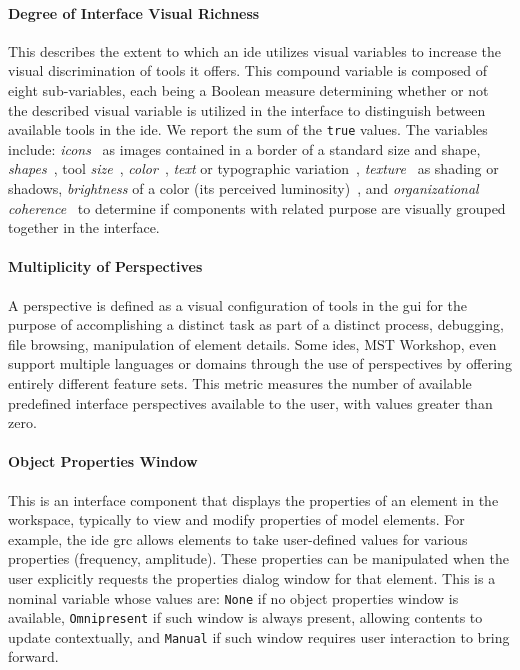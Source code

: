 \paragraph{Degree of Interface Visual Richness}
This describes the extent to which an \ac{ide} utilizes visual variables to increase the visual discrimination of tools it offers.
This compound variable is composed of eight sub-variables, each being a Boolean measure determining whether or not the described visual variable is utilized in the interface to distinguish between available tools in the \ac{ide}.
We report the sum of the \texttt{true} values.
The variables include:
\emph{icons}~\cite{costagliola2002,moody2009} as images contained in a border of a standard size and shape,
\emph{shapes}~\cite{moody2009},
tool \emph{size}~\cite{moody2009},
\emph{color}~\cite{moody2009},
\emph{text} or typographic variation~\cite{moody2009},
\emph{texture}~\cite{moody2009} as shading or shadows,
\emph{brightness} of a color (\ie its perceived luminosity)~\cite{moody2009},
and
\emph{organizational coherence}~\cite{constantine1996} to determine if components with related purpose are visually grouped together in the interface.


\paragraph{Multiplicity of Perspectives}
A perspective is defined as a visual configuration of tools in the \ac{gui}
for the purpose of accomplishing a distinct task as part of a distinct
process, \eg debugging, file browsing, manipulation of element details.
Some \acp{ide}, \eg MST Workshop, even support multiple languages or
domains through the use of perspectives by offering entirely different
feature sets. This metric measures the number of available predefined
interface perspectives available to the user, with values greater than
zero.


\paragraph{Object Properties Window}
This is an interface component that displays the properties of an element
in the workspace, typically to view and modify properties of model
elements. For example, the \ac{ide} \ac{grc} allows elements to take
user-defined values for various properties (\eg frequency, amplitude).
These properties can be manipulated when the user explicitly requests the
properties dialog window for that element.
This is a nominal variable whose values are:
\texttt{None} if no object properties window is available,
\texttt{Omnipresent} if such window is always present, allowing contents to update contextually,
and \texttt{Manual} if such window requires user interaction to bring forward.


